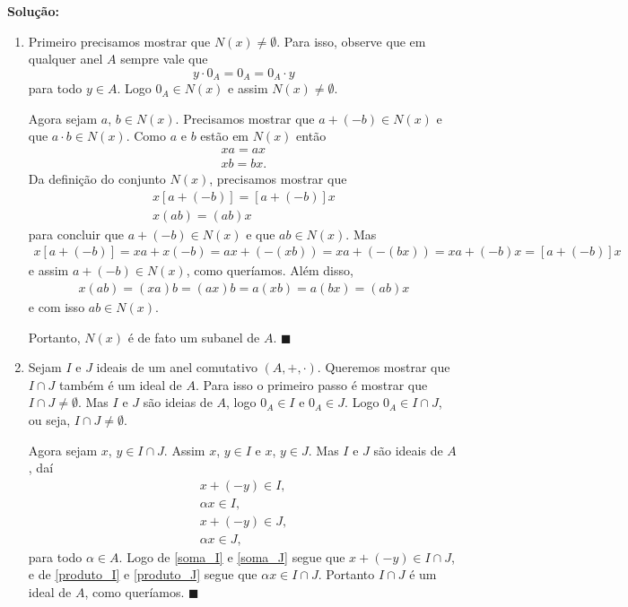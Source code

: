 \documentclass[12pt]{exam}
\renewcommand{\qedsymbol}{$\blacksquare$}
\begin{document}
    \noindent\textbf{Solu\c{c}\~ao:}
    \begin{enumerate}[label=({\roman*})]
        \item Primeiro precisamos mostrar que $N(x) \ne \emptyset$. Para isso, observe que em qualquer anel $A$ sempre vale que
            \[ y \cdot 0_A = 0_A = 0_A\cdot y\]
        para todo $y \in A$. Logo $0_A \in N(x)$ e assim $N(x) \ne \emptyset$.

        Agora sejam $a$, $b \in N(x)$. Precisamos mostrar que $a + (-b)\in N(x)$ e que $a\cdot b \in N(x)$. Como $a$ e $b$ estão em $N(x)$
        então
        \begin{align}
            xa = ax\\
            xb = bx.
        \end{align}
        Da definição do conjunto $N(x)$, precisamos mostrar que
        \begin{align}
            x[a + (-b)] = [a + (-b)]x\\
            x(ab) = (ab)x
        \end{align}
        para concluir que $a + (-b) \in N(x)$ e que $ab \in N(x)$. Mas
        \begin{align*}
            x[a + (-b)] = xa + x(-b) = ax + (-(xb)) = xa + (-(bx)) = xa + (-b)x = [a + (-b)]x
        \end{align*}
        e assim $a + (-b) \in N(x)$, como queríamos. Além disso,
        \begin{align*}
            x(ab) = (xa)b = (ax)b = a(xb) = a(bx) = (ab)x
        \end{align*}
        e com isso $ab \in N(x)$.

        Portanto, $N(x)$ é de fato um subanel de $A$. \hspace{.1cm} \qedsymbol
        \item Sejam $I$ e $J$ ideais de um anel comutativo $(A, +, \cdot)$. Queremos mostrar que $I \cap J$ também é um ideal de $A$. Para
            isso o primeiro passo é mostrar que $I \cap J \ne \emptyset$. Mas $I$ e $J$ são ideias de $A$, logo $0_A \in I$ e $0_A \in J$.
            Logo $0_A \in I \cap J$, ou seja, $I \cap J \ne \emptyset$.

            Agora sejam $x$, $y \in I \cap J$. Assim $x$, $y \in I$ e $x$, $y \in J$. Mas $I$ e $J$ são ideais de $A$, daí
            \begin{align}
                x + (-y) \in I,\label{soma_I}\\
                \alpha x \in I,\label{produto_I}\\
                x + (-y) \in J,\label{soma_J}\\
                \alpha x \in J\label{produto_J},
            \end{align}
            para todo $\alpha \in A$. Logo de \eqref{soma_I} e \eqref{soma_J} segue que $x + (-y) \in I \cap J$, e de \eqref{produto_I} e
            \eqref{produto_J} segue que $\alpha x \in I \cap J$. Portanto $I \cap J$ é um ideal de $A$, como queríamos. \hspace{.1cm} \qedsymbol
    \end{enumerate}
\end{document}
